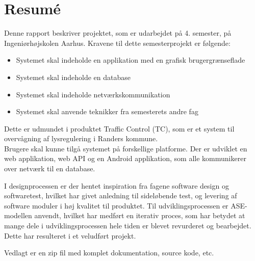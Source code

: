 \chapter*{Resumé}
Denne rapport beskriver projektet, som er udarbejdet på 4. semester, på Ingeniørhøjskolen Aarhus. Kravene til dette semesterprojekt er følgende:

\begin{itemize}
	\item Systemet skal indeholde en applikation med en grafisk brugergrænseflade
	\item Systemet skal indeholde en database
	\item Systemet skal indeholde netværkskommunikation
	\item Systemet skal anvende teknikker fra semesterets andre fag 
\end{itemize}

Dette er udmundet i produktet Traffic Control (TC), som er et system til overvågning af lysregulering i Randers kommune.\\
Brugere skal kunne tilgå systemet på forskellige platforme.
Der er udviklet en web applikation, web API og en Android applikation, som alle kommunikerer over netværk til en database.

I designprocessen er der hentet inspiration fra fagene software design og softwaretest, hvilket har givet anledning til sideløbende test, og levering af software moduler i høj kvalitet til produktet. Til udviklingsprocessen er ASE-modellen anvendt, hvilket har medført en iterativ proces, som har betydet at mange dele i udviklingsprocessen hele tiden er blevet revurderet og bearbejdet. Dette har resulteret i et veludført projekt.

Vedlagt er en zip fil med komplet dokumentation, source kode, etc.

\clearpage